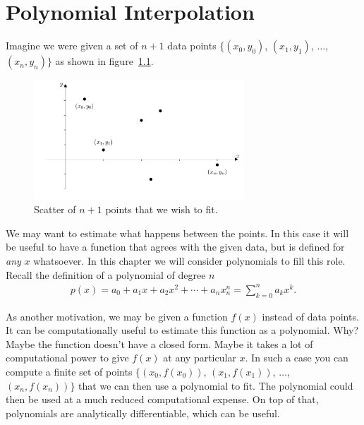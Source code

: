 \chapter{Polynomial Interpolation} \label{ch:polynomial}

Imagine we were given a set of $n+1$ data points $\{ (x_0,y_0)$, $(x_1,y_1)$, $\dots$, $(x_n,y_n) \}$ as shown in figure~\ref{fig:ch3_scatter}.
\begin{figure}[H]
	\begin{center}
	\includegraphics[width=0.7\textwidth]{figures/ch3_scatter.pdf} 
	  \caption{Scatter of $n+1$ points that we wish to fit.} \label{fig:ch3_scatter}
	\end{center}
\end{figure}
We may want to estimate what happens between the points. In this case it will be useful to have a function that agrees with the given data, but is defined for \textit{any} $x$ whatsoever. In this chapter we will consider polynomials to fill this role. Recall the definition of a polynomial of degree $n$
\begin{align*}
p(x) = a_0 + a_1 x + a_2 x^2 + \cdots + a_n x_n^n = \sum_{k=0}^n a_k x^k.
\end{align*}

As another motivation, we may be given a function $f(x)$ instead of data points. It can be computationally useful to estimate this function as a polynomial. Why? Maybe the function doesn't have a closed form. Maybe it takes a lot of computational power to give $f(x)$ at any particular $x$. In such a case you can compute a finite set of points $\{ (x_0,f(x_0))$, $(x_1,f(x_1))$, $\dots$, $(x_n,f(x_n)) \}$ that we can then use a polynomial to fit. The polynomial could then be used at a much reduced computational expense. On top of that, polynomials are analytically differentiable, which can be useful.



